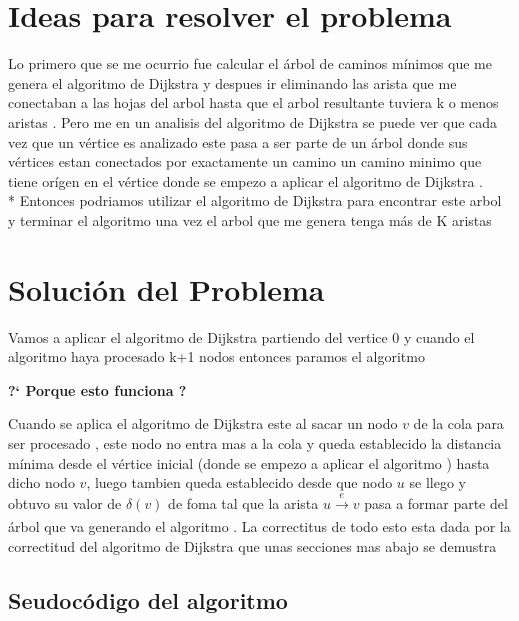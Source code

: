 \documentclass[10pt]{article}
\begin{document}
    \section{Ideas para resolver el problema} 

    \noindent Lo primero que se me ocurrio fue calcular el \'arbol de caminos m\'inimos que me genera el algoritmo de Dijkstra y despues ir eliminando las arista 
    que me conectaban a las hojas del arbol hasta que el arbol resultante tuviera k o menos aristas .
    Pero me en un analisis del algoritmo de Dijkstra se puede ver que cada vez que un v\'ertice es analizado este pasa a ser parte de un \'arbol donde sus v\'ertices estan conectados por exactamente un camino 
    un camino minimo que tiene or\'igen en el v\'ertice donde se empezo a aplicar el algoritmo de Dijkstra .
    \\*
    Entonces podriamos utilizar el algoritmo de Dijkstra para encontrar este arbol y terminar el algoritmo una vez el arbol que me genera tenga m\'as de K aristas  

    \section{Soluci\'on del Problema }

    \noindent Vamos a aplicar el algoritmo de Dijkstra partiendo del vertice 0 y cuando el algoritmo haya procesado k+1 nodos entonces paramos el algoritmo

    \vspace*{0.5cm}

    \noindent \textbf{ ?` Porque esto funciona ?}

    \noindent Cuando se aplica el algoritmo de Dijkstra este al sacar un nodo $v$ de la cola para ser procesado , este nodo no entra mas a la cola y queda establecido la distancia m\'inima desde el v\'ertice inicial (donde se empezo a aplicar el algoritmo ) hasta dicho nodo $v$, luego tambien queda establecido desde que nodo $u$ se llego y obtuvo su valor de $\delta \left(v\right)$ de foma tal que la arista $u \xrightarrow[]{e} v $ pasa a formar parte del \'arbol que va generando el algoritmo . La correctitus de todo esto esta dada por la correctitud del algoritmo de Dijkstra que unas secciones mas abajo se demustra

    \subsection{Seudoc\'odigo del algoritmo } 
\end{document}
